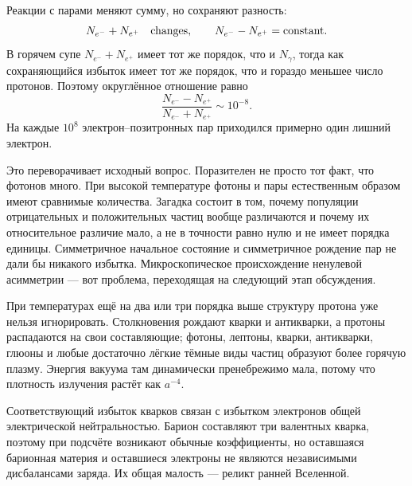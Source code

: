 \begin{classroomqa}
\end{classroomqa}

Реакции с парами меняют сумму, но сохраняют разность:
\begin{equation}
N_{e^-}+N_{e^+}\quad\hbox{changes},
\qquad
N_{e^-}-N_{e^+}=\hbox{constant}.
\label{eq:c07-pair-invariants}
\end{equation}
В горячем супе \(N_{e^-}+N_{e^+}\) имеет тот же порядок, что и \(N_\gamma\), тогда как сохраняющийся избыток имеет тот же порядок, что и гораздо меньшее число протонов. Поэтому округлённое отношение равно
\begin{equation}
\boxed{
\frac{N_{e^-}-N_{e^+}}
{N_{e^-}+N_{e^+}}
\sim10^{-8}
}.
\label{eq:c07-asymmetry}
\end{equation}
На каждые \(10^8\) электрон--позитронных пар приходился примерно один лишний электрон.

Это переворачивает исходный вопрос. Поразителен не просто тот факт, что фотонов много. При высокой температуре фотоны и пары естественным образом имеют сравнимые количества. Загадка состоит в том, почему популяции отрицательных и положительных частиц вообще различаются и почему их относительное различие мало, а не в точности равно нулю и не имеет порядка единицы. Симметричное начальное состояние и симметричное рождение пар не дали бы никакого избытка. Микроскопическое происхождение ненулевой асимметрии — вот проблема, переходящая на следующий этап обсуждения.

При температурах ещё на два или три порядка выше структуру протона уже нельзя игнорировать. Столкновения рождают кварки и антикварки, а протоны распадаются на свои составляющие; фотоны, лептоны, кварки, антикварки, глюоны и любые достаточно лёгкие тёмные виды частиц образуют более горячую плазму. Энергия вакуума там динамически пренебрежимо мала, потому что плотность излучения растёт как \(a^{-4}\).

Соответствующий избыток кварков связан с избытком электронов общей электрической нейтральностью. Барион составляют три валентных кварка, поэтому при подсчёте возникают обычные коэффициенты, но оставшаяся барионная материя и оставшиеся электроны не являются независимыми дисбалансами заряда. Их общая малость — реликт ранней Вселенной.


